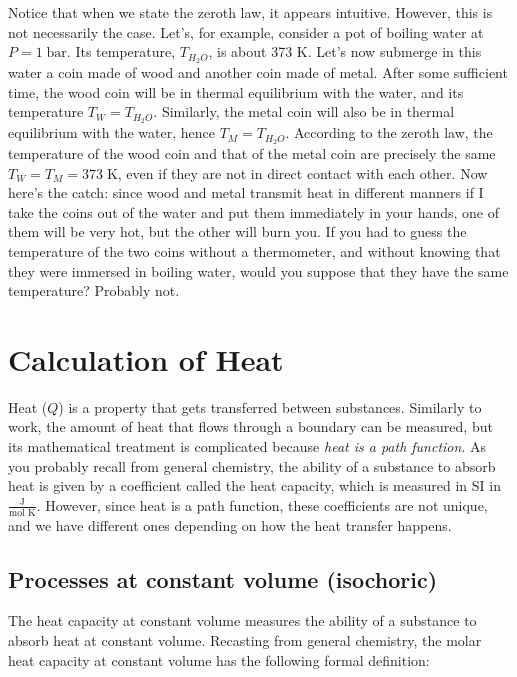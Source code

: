 \documentclass[
  9pt,
]{extbook}
\theoremstyle{definition}
\theoremstyle{definition}
\theoremstyle{definition}
\theoremstyle{remark}
\begin{document}
Notice that when we state the zeroth law, it appears intuitive. However, this is not necessarily the case. Let's, for example, consider a pot of boiling water at \(P=1\;\mathrm{bar}\). Its temperature, \(T_{H_2O}\), is about 373 K. Let's now submerge in this water a coin made of wood and another coin made of metal. After some sufficient time, the wood coin will be in thermal equilibrium with the water, and its temperature \(T_W = T_{H_2O}\). Similarly, the metal coin will also be in thermal equilibrium with the water, hence \(T_M = T_{H_2O}\). According to the zeroth law, the temperature of the wood coin and that of the metal coin are precisely the same \(T_W = T_M = 373\;\mathrm{K}\), even if they are not in direct contact with each other. Now here's the catch: since wood and metal transmit heat in different manners if I take the coins out of the water and put them immediately in your hands, one of them will be very hot, but the other will burn you. If you had to guess the temperature of the two coins without a thermometer, and without knowing that they were immersed in boiling water, would you suppose that they have the same temperature? Probably not.

\hypertarget{heatint}{%
\section{Calculation of Heat}\label{heatint}}

Heat (\(Q\)) is a property that gets transferred between substances. Similarly to work, the amount of heat that flows through a boundary can be measured, but its mathematical treatment is complicated because \emph{heat is a path function}.
As you probably recall from general chemistry, the ability of a substance to absorb heat is given by a coefficient called the heat capacity, which is measured in SI in \(\frac{\text{J}}{\text{mol K}}\). However, since heat is a path function, these coefficients are not unique, and we have different ones depending on how the heat transfer happens.

\hypertarget{processes-at-constant-volume-isochoric}{%
\subsection{Processes at constant volume (isochoric)}\label{processes-at-constant-volume-isochoric}}

The heat capacity at constant volume measures the ability of a substance to absorb heat at constant volume. Recasting from general chemistry, the molar heat capacity at constant volume has the following formal definition:
\end{document}
